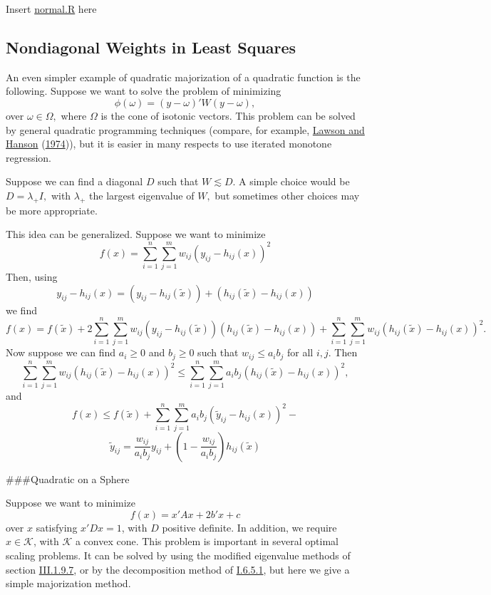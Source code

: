 \documentclass[
  12pt,
]{book}
\begin{document}
Insert \href{../code/normal.R}{normal.R} here

\hypertarget{nondiagonal-weights-in-least-squares}{%
\subsection{Nondiagonal Weights in Least Squares}\label{nondiagonal-weights-in-least-squares}}

An even simpler example of quadratic majorization of
a quadratic function is the following. Suppose we want
to solve the problem of minimizing
\[
\phi(\omega)=
(y-\omega)'W(y-\omega),
\]
over \(\omega\in\Omega,\)
where \(\Omega\) is the cone of isotonic vectors. This
problem can be solved by general quadratic programming
techniques (compare, for example, \protect\hyperlink{ref-lawson_hanson_74}{Lawson and Hanson} (\protect\hyperlink{ref-lawson_hanson_74}{1974})), but
it is easier in many respects to use iterated monotone
regression.

Suppose we can find a diagonal \(D\) such that \(W\lesssim D.\)
A simple choice
would be \(D=\lambda_+I,\)
with \(\lambda_+\)
the largest eigenvalue of \(W,\) but sometimes other choices
may be more appropriate.

This idea can be generalized. Suppose we want to minimize
\[
f(x)=\sum_{i=1}^n\sum_{j=1}^m w_{ij}(y_{ij}-h_{ij}(x))^2
\]
Then, using
\[
y_{ij}-h_{ij}(x)=(y_{ij}-h_{ij}(\tilde x))+(h_{ij}(\tilde x)-h_{ij}(x))
\]
we find
\[
f(x)=f(\tilde x)+2\sum_{i=1}^n\sum_{j=1}^mw_{ij}(y_{ij}-h_{ij}(\tilde x))(h_{ij}(\tilde x)-h_{ij}(x))+\sum_{i=1}^n\sum_{j=1}^mw_{ij}(h_{ij}(\tilde x)-h_{ij}(x))^2.
\]
Now suppose we can find \(a_i\geq 0\) and \(b_j\geq 0\) such that \(w_{ij}\leq a_ib_j\) for all \(i,j\). Then
\[
\sum_{i=1}^n\sum_{j=1}^mw_{ij}(h_{ij}(\tilde x)-h_{ij}(x))^2\leq\sum_{i=1}^n\sum_{j=1}^ma_ib_j(h_{ij}(\tilde x)-h_{ij}(x))^2,
\]
and
\[
f(x)\leq f(\tilde x)+\sum_{i=1}^n\sum_{j=1}^ma_ib_j(\tilde y_{ij}-h_{ij}(x))^2-
\]
\[
\tilde y_{ij}=\frac{w_{ij}}{a_ib_j}y_{ij}+(1-\frac{w_{ij}}{a_ib_j})h_{ij}(\tilde x)
\]

\#\#\#Quadratic on a Sphere

Suppose we want to minimize
\[
f(x)=x'Ax+2b'x+c
\]
over \(x\) satisfying \(x'Dx=1\), with \(D\) positive definite. In addition, we require \(x\in\mathcal{K}\), with \(\mathcal{K}\) a convex cone. This problem is important in several optimal scaling problems. It can be solved by using the modified eigenvalue methods of section \href{http://jandeleeuw.gitbooks.io/bras3/content/background/qcircle.html}{III.1.9.7}, or by the decomposition method of \href{http://jandeleeuw.gitbooks.io/bras1/content/augmentationmethods/quadsphere.html}{I.6.5.1}, but here we give a simple majorization method.
\end{document}
